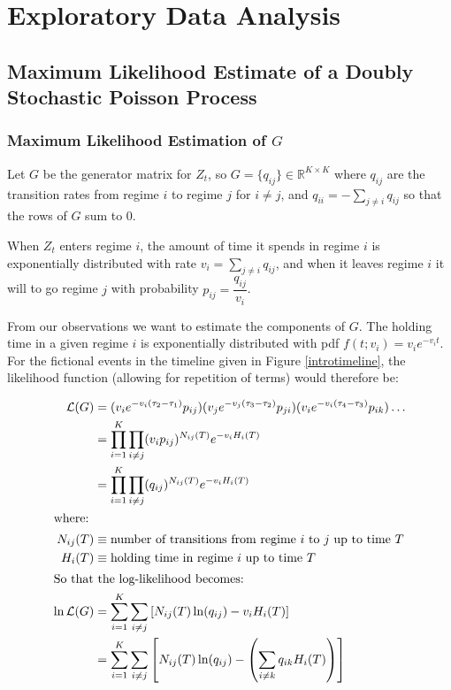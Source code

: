 \chapter{Exploratory Data Analysis}

\section{Maximum Likelihood Estimate of a Doubly Stochastic Poisson Process}


\subsection{Maximum Likelihood Estimation of \texorpdfstring{$G$}{G}}

Let $G$ be the generator matrix for $Z_t$, so $G = \{ q_{ij} \} \in \mathbb{R}^{K \times K}$ where $q_{ij}$ are the transition rates from regime $i$ to regime $j$ for $i\neq j$, and $q_{ii} = - \sum\limits_{j \neq i} q_{ij}$ so that the rows of $G$ sum to 0. 

When $Z_t$ enters regime $i$, the amount of time it spends in regime $i$ is exponentially distributed with rate $v_i = \sum\limits_{j \neq i} q_{ij}$, and when it leaves regime $i$ it will to go regime $j$ with probability $p_{ij} = \dfrac{q_{ij}}{v_i}$. 

From our observations we want to estimate the components of $G$. The holding time in a given regime $i$ is exponentially distributed with pdf $f(t;v_i) = v_i e^{-v_i t}$. For the fictional events in the timeline given in Figure \ref{introtimeline}, the likelihood function (allowing for repetition of terms) would therefore be:

\begin{align}
\mathcal{L}(G) &= (v_{i} e^{-v_{i}(\tau_2 - \tau_1)} p_{ij}) (v_{j} e^{-v_{j}(\tau_3 - \tau_2)} p_{ji}) (v_{i} e^{-v_{i}(\tau_4 - \tau_3)} p_{ik}) \dots \\
&= \prod\limits_{i=1}^{K} \prod\limits_{i \neq j} (v_{i}p_{ij})^{N_{ij}(T)} e^{-v_{i}H_i(T)} \\
&= \prod\limits_{i=1}^{K} \prod\limits_{i \neq j} (q_{ij})^{N_{ij}(T)} e^{-v_{i}H_i(T)} \\
\intertext{where:}
N_{ij}(T) & \equiv \mbox{number of transitions from regime $i$ to $j$ up to time $T$} \nonumber \\
H_{i}(T) & \equiv \mbox{holding time in regime $i$ up to time $T$} \nonumber \\
\intertext{So that the log-likelihood becomes:} 
\ln \mathcal{L}(G) & = \sum\limits_{i=1}^{K} \sum\limits_{i \neq j} \left[ N_{ij}(T) \ln(q_{ij}) - v_{i} H_i(T) \right] \\
&= \sum\limits_{i=1}^{K} \sum\limits_{i \neq j} \left[ N_{ij}(T) \ln(q_{ij}) - \left( \sum\limits_{i \neq k} q_{ik} H_i(T) \right) \right]
\end{align}

